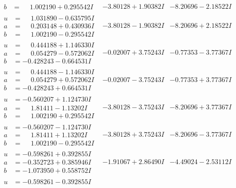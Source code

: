 \documentclass[1p]{elsarticle_modified}
\theoremstyle{definition}
\begin{document}
$$\begin{array}{c|c|c}
\begin{aligned}
b &= \phantom{-}1.002190 + 0.295542 I\end{aligned}
 & -3.80128 + 1.90382 I & -8.20696 - 2.18522 I \\ \hline\begin{aligned}
u &= \phantom{-}1.031890 - 0.635795 I \\
a &= \phantom{-}0.203148 + 0.430936 I \\
b &= \phantom{-}1.002190 - 0.295542 I\end{aligned}
 & -3.80128 - 1.90382 I & -8.20696 + 2.18522 I \\ \hline\begin{aligned}
u &= \phantom{-}0.444188 + 1.146330 I \\
a &= \phantom{-}0.054279 - 0.572062 I \\
b &= -0.428243 - 0.664531 I\end{aligned}
 & -0.02007 + 3.75243 I & -0.77353 - 3.77367 I \\ \hline\begin{aligned}
u &= \phantom{-}0.444188 - 1.146330 I \\
a &= \phantom{-}0.054279 + 0.572062 I \\
b &= -0.428243 + 0.664531 I\end{aligned}
 & -0.02007 - 3.75243 I & -0.77353 + 3.77367 I \\ \hline\begin{aligned}
u &= -0.560207 + 1.124730 I \\
a &= \phantom{-}1.81411 - 1.13202 I \\
b &= \phantom{-}1.002190 + 0.295542 I\end{aligned}
 & -3.80128 - 3.75243 I & -8.20696 + 3.77367 I \\ \hline\begin{aligned}
u &= -0.560207 - 1.124730 I \\
a &= \phantom{-}1.81411 + 1.13202 I \\
b &= \phantom{-}1.002190 - 0.295542 I\end{aligned}
 & -3.80128 + 3.75243 I & -8.20696 - 3.77367 I \\ \hline\begin{aligned}
u &= -0.598261 + 0.392855 I \\
a &= -0.352723 + 0.385946 I \\
b &= -1.073950 + 0.558752 I\end{aligned}
 & -1.91067 + 2.86490 I & -4.49024 - 2.53112 I \\ \hline\begin{aligned}
u &= -0.598261 - 0.392855 I \\

\end{aligned}
\end{array}$$
\end{document}
